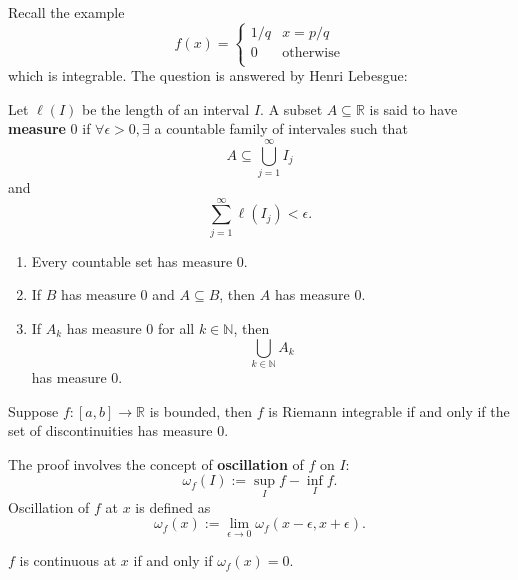 Recall the example 
\[
    f(x) = \begin{cases}
    1/q &x=p/q\\
    0 &\text{otherwise}\\
    \end{cases} 
\]
which is integrable. The question is answered by Henri Lebesgue:
\begin{definition}
    Let $ \ell (I) $ be the length of an interval $I$. A subset $A \subseteq \mathbb{R}$ is said to have \textbf{measure} 0 if $ \forall \epsilon>0, \exists  $ a countable family of intervales such that 
    \[
        A \subseteq \bigcup_{j=1}^{\infty}I_j
    \]
    and 
    \[
        \sum_{j=1}^{\infty}\ell (I_j)<\epsilon.
    \]
\end{definition}
\begin{lemma}
    \begin{enumerate}
        \item Every countable set has measure 0.
        \item If $B$ has measure 0 and $ A \subseteq B $, then $A$ has measure 0.
        \item If $A_k$ has measure 0 for all $ k\in \mathbb{N} $, then 
        \[
            \bigcup_{k\in \mathbb{N}} A_k
        \]
        has measure 0.
    \end{enumerate}
\end{lemma}
\begin{theorem}
    Suppose $ f:[a,b]\to \mathbb{R} $ is bounded, then $f$ is Riemann integrable if and only if the set of discontinuities has measure 0.
\end{theorem}
The proof involves the concept of \textbf{oscillation} of $f$ on $I$:
\[
    \omega_f(I) := \sup_I f-\inf _I f.
\]
Oscillation of $f$ at $x$ is defined as 
\[
    \omega_f(x):=\lim_{\epsilon \to 0} \omega_f(x-\epsilon,x+\epsilon).
\]
\begin{lemma}
    $f$ is continuous at $x$ if and only if $ \omega_f(x)=0 $.
\end{lemma}

